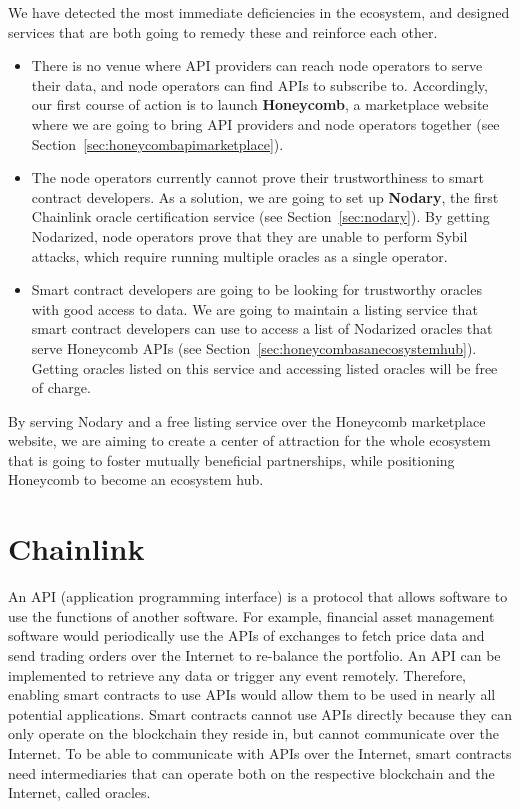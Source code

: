 \documentclass[12pt]{article}
\begin{document}
We have detected the most immediate deficiencies in the ecosystem, and designed services that are both going to remedy these and reinforce each other.
\begin{itemize}
	\item There is no venue where API providers can reach node operators to serve their data, and node operators can find APIs to subscribe to.
	Accordingly, our first course of action is to launch \textbf{Honeycomb}, a marketplace website where we are going to bring API providers and node operators together (see Section~\ref{sec:honeycombapimarketplace}).
	\item The node operators currently cannot prove their trustworthiness to smart contract developers.
	As a solution, we are going to set up \textbf{Nodary}, the first Chainlink oracle certification service (see Section~\ref{sec:nodary}).
	By getting Nodarized, node operators prove that they are unable to perform Sybil attacks, which require running multiple oracles as a single operator.
	\item Smart contract developers are going to be looking for trustworthy oracles with good access to data.
	We are going to maintain a listing service that smart contract developers can use to access a list of Nodarized oracles that serve Honeycomb APIs (see Section~\ref{sec:honeycombasanecosystemhub}).
	Getting oracles listed on this service and accessing listed oracles will be free of charge.
\end{itemize}
By serving Nodary and a free listing service over the Honeycomb marketplace website, we are aiming to create a center of attraction for the whole ecosystem that is going to foster mutually beneficial partnerships, while positioning Honeycomb to become an ecosystem hub.


\section{Chainlink}
\label{sec:chainlink}

An API (application programming interface) is a protocol that allows software to use the functions of another software.
For example, financial asset management software would periodically use the APIs of exchanges to fetch price data and send trading orders over the Internet to re-balance the portfolio.
An API can be implemented to retrieve any data or trigger any event remotely.
Therefore, enabling smart contracts to use APIs would allow them to be used in nearly all potential applications.
Smart contracts cannot use APIs directly because they can only operate on the blockchain they reside in, but cannot communicate over the Internet.
To be able to communicate with APIs over the Internet, smart contracts need intermediaries that can operate both on the respective blockchain and the Internet, called oracles.
\end{document}
